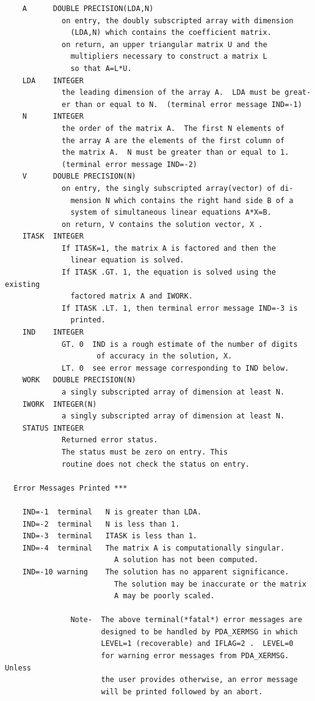 \documentclass[11pt,twoside]{article}
\begin{document}
\begin{verbatim}
    A      DOUBLE PRECISION(LDA,N)
             on entry, the doubly subscripted array with dimension
               (LDA,N) which contains the coefficient matrix.
             on return, an upper triangular matrix U and the
               multipliers necessary to construct a matrix L
               so that A=L*U.
    LDA    INTEGER
             the leading dimension of the array A.  LDA must be great-
             er than or equal to N.  (terminal error message IND=-1)
    N      INTEGER
             the order of the matrix A.  The first N elements of
             the array A are the elements of the first column of
             the matrix A.  N must be greater than or equal to 1.
             (terminal error message IND=-2)
    V      DOUBLE PRECISION(N)
             on entry, the singly subscripted array(vector) of di-
               mension N which contains the right hand side B of a
               system of simultaneous linear equations A*X=B.
             on return, V contains the solution vector, X .
    ITASK  INTEGER
             If ITASK=1, the matrix A is factored and then the
               linear equation is solved.
             If ITASK .GT. 1, the equation is solved using the existing
               factored matrix A and IWORK.
             If ITASK .LT. 1, then terminal error message IND=-3 is
               printed.
    IND    INTEGER
             GT. 0  IND is a rough estimate of the number of digits
                     of accuracy in the solution, X.
             LT. 0  see error message corresponding to IND below.
    WORK   DOUBLE PRECISION(N)
             a singly subscripted array of dimension at least N.
    IWORK  INTEGER(N)
             a singly subscripted array of dimension at least N.
    STATUS INTEGER
             Returned error status.
             The status must be zero on entry. This
             routine does not check the status on entry.

  Error Messages Printed ***

    IND=-1  terminal   N is greater than LDA.
    IND=-2  terminal   N is less than 1.
    IND=-3  terminal   ITASK is less than 1.
    IND=-4  terminal   The matrix A is computationally singular.
                         A solution has not been computed.
    IND=-10 warning    The solution has no apparent significance.
                         The solution may be inaccurate or the matrix
                         A may be poorly scaled.

               Note-  The above terminal(*fatal*) error messages are
                      designed to be handled by PDA_XERMSG in which
                      LEVEL=1 (recoverable) and IFLAG=2 .  LEVEL=0
                      for warning error messages from PDA_XERMSG.  Unless
                      the user provides otherwise, an error message
                      will be printed followed by an abort.


\end{verbatim}
\end{document}
